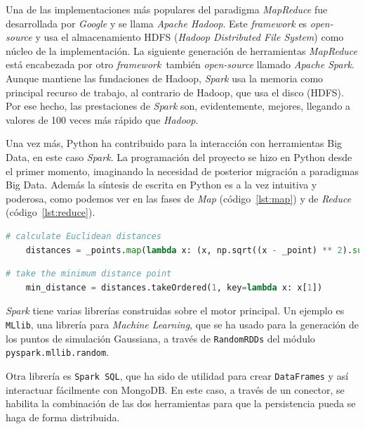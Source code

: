 \documentclass[11pt,spanish,listoffigures,listoftables]{tfgetsinf}
\begin{document}
        Una de las implementaciones más populares del paradigma {\em MapReduce} fue desarrollada por {\em Google} y se llama {\em Apache Hadoop}. Este {\em framework} es {\em open-source} y usa el almacenamiento HDFS ({\em Hadoop Distributed File System}) como núcleo de la implementación. La siguiente generación de herramientas {\em MapReduce} está encabezada por otro {\em framework} también {\em open-source} llamado {\em Apache Spark}. Aunque mantiene las fundaciones de Hadoop, {\em Spark} usa la memoria como principal recurso de trabajo, al contrario de Hadoop, que usa el disco (HDFS). Por ese hecho, las prestaciones de {\em Spark} son, evidentemente, mejores, llegando a valores de 100 veces más rápido que {\em Hadoop}.
        
        Una vez más, Python ha contribuido para la interacción con herramientas Big Data, en este caso {\em Spark}. La programación del proyecto se hizo en Python desde el primer momento, imaginando la necesidad de posterior migración a paradigmas Big Data. Además la síntesis de escrita en Python es a la vez intuitiva y poderosa, como podemos ver en las fases de {\em Map} (código~\ref{lst:map}) y de {\em Reduce} (código~\ref{lst:reduce}).
        
        \begin{lstlisting}[language=Python, caption=Map en Python., label={lst:map}]
    # calculate Euclidean distances
    distances = _points.map(lambda x: (x, np.sqrt((x - _point) ** 2).sum()))
	\end{lstlisting}
	        
        \begin{lstlisting}[language=Python, caption=Reduce en Python., label={lst:reduce}]
    # take the minimum distance point
    min_distance = distances.takeOrdered(1, key=lambda x: x[1])
	\end{lstlisting}
	
	{\em Spark} tiene varias librerías construidas sobre el motor principal. Un ejemplo es {\tt MLlib}, una librería para {\em Machine Learning}, que se ha usado para la generación de los puntos de simulación Gaussiana, a través de {\tt RandomRDDs} del módulo {\tt pyspark.mllib.random}. 
	
	Otra librería es {\tt Spark SQL}, que ha sido de utilidad para crear {\tt DataFrames} y así interactuar fácilmente con MongoDB. En este caso, a través de un conector, se habilita la combinación de las dos herramientas para que la persistencia pueda se haga de forma distribuida.
        
\end{document}

